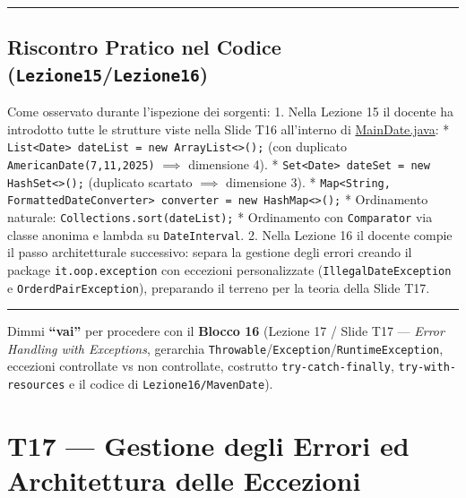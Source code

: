 \documentclass[11pt,a4paper,oneside]{report}
\newcommand{\passthrough}[1]{#1}
\begin{document}
\begin{center}\rule{0.5\linewidth}{0.5pt}\end{center}

\section{\texorpdfstring{Riscontro Pratico nel Codice
(\texttt{Lezione15}/\texttt{Lezione16})}{Riscontro Pratico nel Codice (Lezione15/Lezione16)}}\label{chap15_riscontro-pratico-nel-codice-lezione15lezione16}

Come osservato durante l'ispezione dei sorgenti: 1. Nella Lezione 15 il
docente ha introdotto tutte le strutture viste nella Slide T16
all'interno di
\href{file:///home/wally/Documenti/GitHub/Programmazione-II/25-26/Teoria-e-Esercitazioni/Codice-20260902/Lezione15/MavenDate/src/main/java/it/oop/ui/MainDate.java}{MainDate.java}:
* \passthrough{\lstinline!List<Date> dateList = new ArrayList<>();!}
(con duplicato \passthrough{\lstinline!AmericanDate(7,11,2025)!}
\(\implies\) dimensione 4). *
\passthrough{\lstinline!Set<Date> dateSet = new HashSet<>();!}
(duplicato scartato \(\implies\) dimensione 3). *
\passthrough{\lstinline!Map<String, FormattedDateConverter> converter = new HashMap<>();!}
* Ordinamento naturale:
\passthrough{\lstinline!Collections.sort(dateList);!} * Ordinamento con
\passthrough{\lstinline!Comparator!} via classe anonima e lambda su
\passthrough{\lstinline!DateInterval!}. 2. Nella Lezione 16 il docente
compie il passo architetturale successivo: separa la gestione degli
errori creando il package \passthrough{\lstinline!it.oop.exception!} con
eccezioni personalizzate (\passthrough{\lstinline!IllegalDateException!}
e \passthrough{\lstinline!OrderdPairException!}), preparando il terreno
per la teoria della Slide T17.

\begin{center}\rule{0.5\linewidth}{0.5pt}\end{center}

Dimmi \textbf{``vai''} per procedere con il \textbf{Blocco 16} (Lezione
17 / Slide T17 --- \emph{Error Handling with Exceptions}, gerarchia
\passthrough{\lstinline!Throwable!}/\passthrough{\lstinline!Exception!}/\passthrough{\lstinline!RuntimeException!},
eccezioni controllate vs non controllate, costrutto
\passthrough{\lstinline!try-catch-finally!},
\passthrough{\lstinline!try-with-resources!} e il codice di
\passthrough{\lstinline!Lezione16/MavenDate!}).

\newpage
\chapter[T17 --- Gestione degli Errori ed Architettu]{T17 --- Gestione degli Errori ed Architettura delle Eccezioni}
\label{chap:t17}
\end{document}
